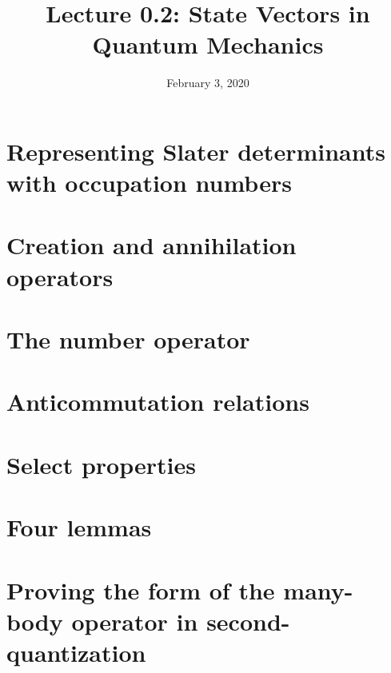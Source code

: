 \documentclass{article}
\title{Lecture 0.2: State Vectors in Quantum Mechanics}
\date{February 3, 2020}
\begin{document}
\maketitle
\noindent
\section{Representing Slater determinants with occupation numbers}
\section{Creation and annihilation operators}
\section{The number operator}
\section{Anticommutation relations}
\section{Select properties}
\section{Four lemmas}
\section{Proving the form of the many-body operator in second-quantization}
\end{document}
